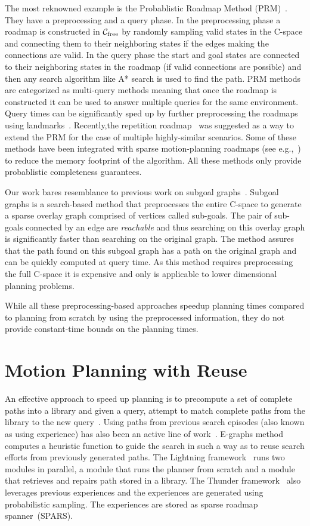 \documentclass[a4paper]{report}
\begin{document}
The most reknowned example is the Probablistic Roadmap Method (PRM)~\cite{kavraki1996probabilistic}. They have a preprocessing and a query phase. In the preprocessing phase a roadmap is constructed in $\mathcal{C}_{\rm free}$ by randomly sampling valid states in the C-space and connecting them to their neighboring states if the edges making the connections are valid. In the query phase the start and goal states are connected to their neighboring states in the roadmap (if valid connections are possible) and then any search algorithm like A* search is used to find the path. PRM methods are categorized as multi-query methods meaning that once the roadmap is constructed it can be used to answer multiple queries for the same environment. Query times can be significantly sped up by further preprocessing the roadmaps using landmarks~\cite{paden2017landmark}. Recently,the repetition roadmap~\cite{LA18} was suggested as a way to extend the PRM for the case of multiple highly-similar scenarios. Some of these methods have been integrated with sparse motion-planning roadmaps (see e.g.,~\cite{SSAH14,DB14}) to reduce the memory footprint of the algorithm. All these methods only provide probablistic completeness guarantees.

Our work bares resemblance to previous work on 
subgoal graphs~\cite{UK17,UK18}.
Subgoal graphs is a search-based method that preprocesses the entire C-space to generate a sparse overlay graph comprised of vertices called sub-goals. The pair of sub-goals connected by an edge are \emph{reachable} and thus searching on this overlay graph is significantly faster than searching on the original graph. The method assures that the path found on this subgoal graph has a path on the original graph and can be quickly computed at query time. As this method requires preprocessing the full C-space it is expensive and only is applicable to lower dimensional planning problems.

While all these preprocessing-based approaches speedup planning times compared to planning from scratch by using the preprocessed information, they do not provide constant-time bounds on the planning times.

\section{Motion Planning with Reuse}
An effective approach to speed up planning is to precompute a set of complete paths into a library and given a query, attempt to match complete paths from the library to the new query~\cite{berenson2012robot,jetchev2013fast}.
Using paths from previous search episodes (also known as using experience) has also been an active line of work~\cite{PCCL12,PDCL13,BAG12,CSMOC15}. E-graphs method~\cite{PCCL12} computes a heuristic function to guide the search in such a way as to reuse search efforts from previously generated paths. The Lightning framework~\cite{BAG12} runs two modules in parallel, a module that runs the planner from scratch and a module that retrieves and repairs path stored in a library. The Thunder framework~\cite{CSMOC15} also leverages previous experiences and the experiences are generated using probabilistic sampling. The experiences are stored as sparse roadmap spanner~(SPARS). 
\end{document}
